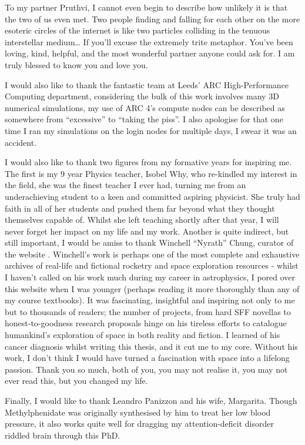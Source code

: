 \begin{acknowledgements}
To my partner Pruthvi, I cannot even begin to describe how unlikely it is that the two of us even met.
Two people finding and falling for each other on the more esoteric circles of the internet is like two particles colliding in the tenuous interstellar medium\ldots{}
If you'll excuse the extremely trite metaphor.
You've been loving, kind, helpful, and the most wonderful partner anyone could ask for.
I am truly blessed to know you and love you.

I would also like to thank the fantastic team at Leeds' ARC High-Performance Computing department, considering the bulk of this work involves many 3D numerical simulations, my use of ARC 4's compute nodes can be described as somewhere from ``excessive'' to ``taking the piss''.
I also apologise for that one time I ran my simulations on the login nodes for multiple days, I swear it was an accident.

I would also like to thank two figures from my formative years for inspiring me.
The first is my 9 year Physics teacher, Isobel Why, who re-kindled my interest in the field, she was the finest teacher I ever had, turning me from an underachieving student to a keen and committed aspiring physicist.
She truly had faith in all of her students and pushed them far beyond what they thought themselves capable of.
Whilst she left teaching shortly after that year, I will never forget her impact on my life and my work.
Another is quite indirect, but still important, I would be amiss to thank Winchell ``Nyrath'' Chung, curator of the website .
Winchell's work is perhaps one of the most complete and exhaustive archives of real-life and fictional rocketry and space exploration resources - whilst I haven't called on his work much during my career in astrophysics, I pored over this website when I was younger (perhaps reading it more thoroughly than any of my course textbooks).
It was fascinating, insightful and inspiring not only to me but to thousands of readers; the number of projects, from hard SFF novellas to honest-to-goodness research proposals hinge on his tireless efforts to catalogue humankind's exploration of space in both reality and fiction.
I learned of his cancer diagnosis whilst writing this thesis, and it cut me to my core.
Without his work, I don't think I would have turned a fascination with space into a lifelong passion.
Thank you so much, both of you, you may not realise it, you may not ever read this, but you changed my life.

Finally, I would like to thank Leandro Panizzon and his wife, Margarita.
Though Methylphenidate was originally synthesised by him to treat her low blood pressure, it also works quite well for dragging my attention-deficit disorder riddled brain through this PhD.

\end{acknowledgements}


